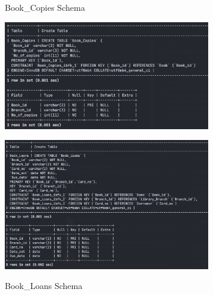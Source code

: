 \documentclass{article}
\begin{document}
\begin{figure}[h!]
    \begin{minipage}[b]{0.5\linewidth}
        \centering
        \caption{Book\_Copies Schema}
        \includegraphics[width=0.8\textwidth]{images/schema-table-book-copies.png}
        \label{fig:schema-book-copies}
    \end{minipage}
    \hspace{0.5cm}
    \begin{minipage}[b]{0.5\linewidth}
        \centering
        \caption{Book\_Loans Schema}
        \includegraphics[width=0.8\textwidth]{images/schema-table-book-loans.png}
        \label{fig:schema-book-loans}
    \end{minipage}
    
\end{figure}
\end{document}
